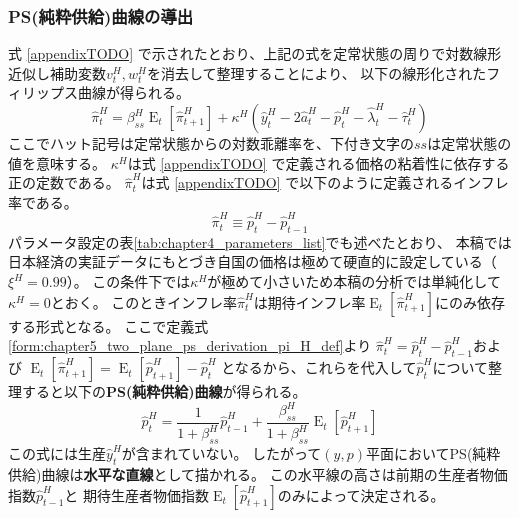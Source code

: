 \subsubsection{PS(純粋供給)曲線の導出}
\label{sec:chapter5_two_plane_ps_derivation}
式
\ref{appendixTODO}
で示されたとおり、上記の式を定常状態の周りで対数線形近似し補助変数\(v_t^H,w_t^H\)を消去して整理することにより、
以下の線形化されたフィリップス曲線が得られる。
\begin{equation}
\label{form:chapter5_two_plane_ps_derivation_pi_H_eq}
\hat{\pi}_t^H=\beta_{ss}^H\operatorname{E}_t[\hat{\pi}_{t+1}^H]+\kappa^H(\hat{y}_t^H-2\hat{a}_t^H-\hat{p}_t^H-\hat{\lambda}_t^H-\hat{\tau}_t^H)
\end{equation}
ここでハット記号\(\hat{}\)は定常状態からの対数乖離率を、下付き文字の\(ss\)は定常状態の値を意味する。
\(\kappa^H\)は式
\eqref{appendixTODO}
で定義される価格の粘着性に依存する正の定数である。
\(\hat{\pi}_t^H\)は式
\eqref{appendixTODO}
で以下のように定義されるインフレ率である。
\begin{equation}
\label{form:chapter5_two_plane_ps_derivation_pi_H_def}
    \hat{\pi}_t^H\equiv\hat{p}_t^H-\hat{p}_{t-1}^H
\end{equation}
パラメータ設定の表\ref{tab:chapter4_parameters_list}でも述べたとおり、
本稿では日本経済の実証データにもとづき自国の価格は極めて硬直的に設定している（\(\xi^H=0.99\)）。
この条件下では\(\kappa^H\)が極めて小さいため本稿の分析では単純化して\(\kappa^H=0\)とおく。
このときインフレ率\(\hat{\pi}_t^H\)は期待インフレ率\(\operatorname{E}_t[\hat{\pi}_{t+1}^H]\)にのみ依存する形式となる。
ここで定義式\eqref{form:chapter5_two_plane_ps_derivation_pi_H_def}より
\(\hat{\pi}_t^H=\hat{p}_t^H-\hat{p}_{t-1}^H\)および
\(\operatorname{E}_t[\hat{\pi}_{t+1}^H]=\operatorname{E}_t[\hat{p}_{t+1}^H]-\hat{p}_t^H\)
となるから、これらを代入して\(\hat{p}_t^H\)について整理すると以下の\textbf{PS(純粋供給)曲線}が得られる。
\begin{equation}
\label{form:chapter5_two_plane_ps_derivation_p_H_eq}
\hat{p}_t^H=\frac{1}{1+\beta_{ss}^H}\hat{p}_{t-1}^H+\frac{\beta_{ss}^H}{1+\beta_{ss}^H}\operatorname{E}_t[\hat{p}_{t+1}^H]
\end{equation}
この式には生産\(\hat{y}_t^H\)が含まれていない。
したがって\((y,p)\)平面においてPS(純粋供給)曲線は\textbf{水平な直線}として描かれる。
この水平線の高さは前期の生産者物価指数\(\hat{p}_{t-1}^H\)と
期待生産者物価指数\(\operatorname{E}_t[\hat{p}_{t+1}^H]\)のみによって決定される。